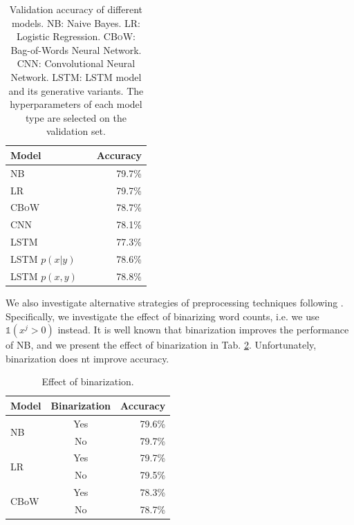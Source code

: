 \documentclass[11pt]{article}
\begin{document}
\begin{table}[h]
\centering
\begin{tabular}{llr}
 \toprule
 Model &  & Accuracy \\
 \midrule
 {\textsc{NB}}    & & {79.7\%}  \\
 \textsc{LR}    & & 79.7\%  \\
 \textsc{CBoW}  & & 78.7\%  \\
 \textsc{CNN}   & & 78.1\%  \\
 \textsc{LSTM}  & & 77.3\%  \\
 \textsc{LSTM $p(x|y)$}  & & 78.6\%  \\
 \textsc{LSTM $p(x,y)$}  & & 78.8\%  \\
 \bottomrule
\end{tabular}
\caption{\label{tab:results} Validation accuracy of different models. \textsc{NB}: Naive Bayes. \textsc{LR}: Logistic Regression. \textsc{CBoW}: Bag-of-Words Neural Network. \textsc{CNN}: Convolutional Neural Network. \textsc{LSTM}: LSTM model and its generative variants. The hyperparameters of each model type are selected on the validation set.}
\end{table}

We also investigate alternative strategies of preprocessing techniques following \cite{wang2012baselines}.
Specifically, we investigate the effect of binarizing word counts, i.e. we use $\mathbb{1}(x^j>0)$ instead. It is well known that binarization improves the performance of \textsc{NB}, and we present the effect of binarization in Tab. \ref{tab:ablation}. Unfortunately, binarization does nt improve accuracy.

\begin{table}[h]
\centering
\begin{tabular}{lcr}
 \toprule
 Model                  & Binarization  & Accuracy \\
 \midrule
 \multirow{2}{*}{NB}    & Yes           & 79.6\%      \\
                        & No            & 79.7\%      \\
 \midrule
 \multirow{2}{*}{LR}    & Yes           & 79.7\%      \\
                        & No            & 79.5\%      \\
 \midrule
 \multirow{2}{*}{CBoW}  & Yes           & 78.3\%      \\
                        & No            & 78.7\%      \\
 
 \bottomrule
\end{tabular}
\caption{\label{tab:ablation} Effect of binarization.}
\end{table}
\end{document}
